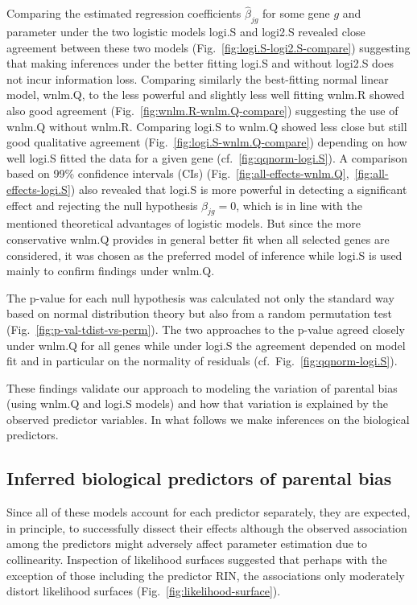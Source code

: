 \documentclass[letterpaper]{article}
\begin{document}
Comparing the estimated regression coefficients \(\hat{\beta}_{jg}\) for some
gene \(g\) and parameter under the two logistic models logi.S and logi2.S
revealed close agreement between these two models
(Fig.~\ref{fig:logi.S-logi2.S-compare}) suggesting that making inferences
under the better fitting logi.S and without logi2.S does not incur information
loss.  Comparing similarly the best-fitting normal linear model, wnlm.Q, to
the less powerful and slightly less well fitting wnlm.R showed also good
agreement (Fig.~\ref{fig:wnlm.R-wnlm.Q-compare}) suggesting the use of wnlm.Q
without wnlm.R.  Comparing logi.S to wnlm.Q showed less close but still good
qualitative agreement (Fig.~\ref{fig:logi.S-wnlm.Q-compare}) depending on how
well logi.S fitted the data for a given gene (cf.~\ref{fig:qqnorm-logi.S}).  A
comparison based on 99\% confidence intervals (CIs)
(Fig.~\ref{fig:all-effects-wnlm.Q},~\ref{fig:all-effects-logi.S}) also
revealed that logi.S is more powerful in detecting a significant effect and
rejecting the null hypothesis \(\beta_{jg}=0\), which is in line with the
mentioned theoretical advantages of logistic models.  But since the more
conservative wnlm.Q provides in general better fit when all selected genes are
considered, it was chosen as the preferred model of inference while logi.S is used mainly
to confirm findings under wnlm.Q.

The p-value for each null hypothesis was
calculated not only the standard way based on normal distribution theory but
also from a random permutation test (Fig.~\ref{fig:p-val-tdist-vs-perm}).  The
two approaches to the p-value agreed closely under wnlm.Q for all genes while
under logi.S the agreement depended on model fit and in particular on the
normality of residuals (cf.~Fig.~\ref{fig:qqnorm-logi.S}).

These findings validate our approach to modeling the variation of parental bias
(using wnlm.Q and logi.S models) and how that variation is explained by
the observed predictor variables.  In what follows we make inferences on
the biological predictors.

\subsection{Inferred biological predictors of parental bias}

Since all of these models account for each predictor separately, they are
expected, in principle, to successfully dissect their effects although the
observed association among the predictors might adversely affect parameter
estimation due to collinearity.  Inspection of likelihood surfaces suggested
that perhaps with the exception of those including the predictor RIN, the
associations only moderately distort likelihood surfaces
(Fig.~\ref{fig:likelihood-surface}).
\end{document}
